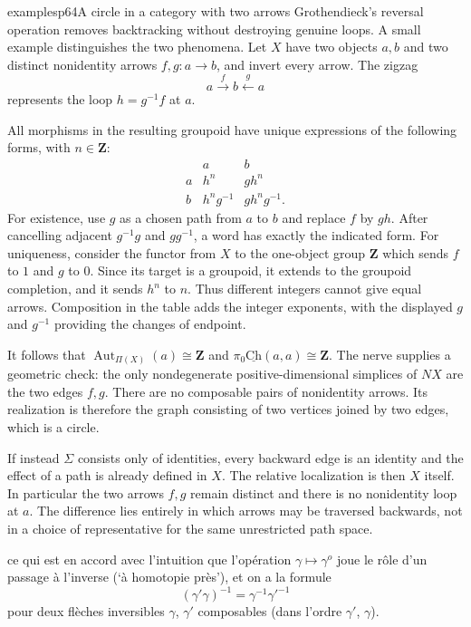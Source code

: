 \begin{dcomment}{examples}{p64}{A circle in a category with two arrows}
Grothendieck's reversal operation removes backtracking without destroying genuine loops. A small example distinguishes the two phenomena. Let $X$ have two objects $a,b$ and two distinct nonidentity arrows $f,g:a\to b$, and invert every arrow. The zigzag
\[
 a\xrightarrow{f}b\xleftarrow{g}a
\]
represents the loop $h=g^{-1}f$ at $a$.

All morphisms in the resulting groupoid have unique expressions of the following forms, with $n\in\mathbf Z$:
\[
\begin{array}{c|cc}
 &a&b\\ \hline
 a&h^n&gh^n\\
 b&h^ng^{-1}&gh^ng^{-1}.
\end{array}
\]
For existence, use $g$ as a chosen path from $a$ to $b$ and replace $f$ by $gh$. After cancelling adjacent $g^{-1}g$ and $gg^{-1}$, a word has exactly the indicated form. For uniqueness, consider the functor from $X$ to the one-object group $\mathbf Z$ which sends $f$ to $1$ and $g$ to $0$. Since its target is a groupoid, it extends to the groupoid completion, and it sends $h^n$ to $n$. Thus different integers cannot give equal arrows. Composition in the table adds the integer exponents, with the displayed $g$ and $g^{-1}$ providing the changes of endpoint.

It follows that $\operatorname{Aut}_{\Pi(X)}(a)\cong\mathbf Z$ and
$\pi_0\underline{\mathrm{Ch}}(a,a)\cong\mathbf Z$. The nerve supplies a geometric check: the only nondegenerate positive-dimensional simplices of $NX$ are the two edges $f,g$. There are no composable pairs of nonidentity arrows. Its realization is therefore the graph consisting of two vertices joined by two edges, which is a circle.

If instead $\Sigma$ consists only of identities, every backward edge is an identity and the effect of a path is already defined in $X$. The relative localization is then $X$ itself. In particular the two arrows $f,g$ remain distinct and there is no nonidentity loop at $a$. The difference lies entirely in which arrows may be traversed backwards, not in a choice of representative for the same unrestricted path space.
\end{dcomment}



ce qui est en accord avec l'intuition que l'opération $\gamma \longmapsto \gamma^o$ joue le rôle d'un passage à l'inverse (`à homotopie près'), et on a la formule
\[
(\gamma'\gamma)^{-1} = \gamma^{-1}\gamma'^{-1}
\]
pour deux flèches inversibles $\gamma$, $\gamma'$ composables (dans l'ordre $\gamma'$, $\gamma$).

